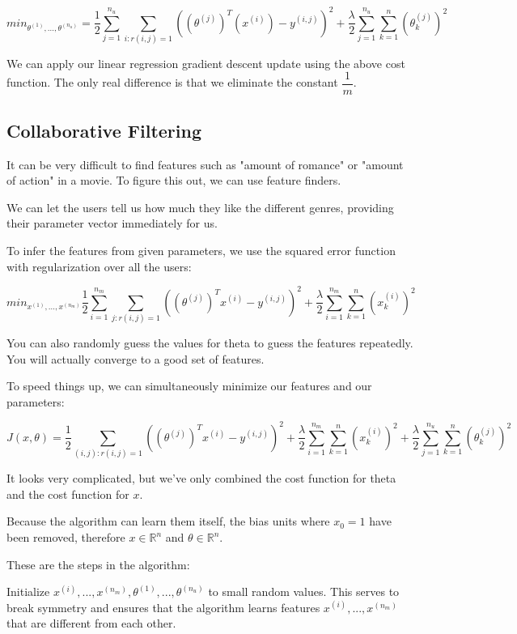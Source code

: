 \documentclass[a4paper,11pt]{report}
\begin{document}
$$min_{\theta^{(1)},\dots,\theta^{(n_u)}} = \dfrac{1}{2}\displaystyle \sum_{j=1}^{n_u} \sum_{i:r(i,j)=1} ((\theta^{(j)})^T(x^{(i)}) - y^{(i,j)})^2 + \dfrac{\lambda}{2} \sum_{j=1}^{n_u} \sum_{k=1}^n(\theta_k^{(j)})^2$$

We can apply our linear regression gradient descent update using the above cost function. The only real difference is that we eliminate the constant $\dfrac{1}{m}$.

\subsection*{Collaborative Filtering}

It can be very difficult to find features such as "amount of romance" or "amount of action" in a movie. To figure this out, we can use feature finders.

We can let the users tell us how much they like the different genres, providing their parameter vector immediately for us.

To infer the features from given parameters, we use the squared error function with regularization over all the users:

$$min_{x^{(1)},\dots,x^{(n_m)}} \dfrac{1}{2} \displaystyle \sum_{i=1}^{n_m} \sum_{j:r(i,j)=1} ((\theta^{(j)})^T x^{(i)} - y^{(i,j)})^2 + \dfrac{\lambda}{2}\sum_{i=1}^{n_m} \sum_{k=1}^{n} (x_k^{(i)})^2$$

You can also randomly guess the values for theta to guess the features repeatedly. You will actually converge to a good set of features.

To speed things up, we can simultaneously minimize our features and our parameters:

$$J(x,\theta) = \dfrac{1}{2} \displaystyle \sum_{(i,j):r(i,j)=1}((\theta^{(j)})^Tx^{(i)} - y^{(i,j)})^2 + \dfrac{\lambda}{2}\sum_{i=1}^{n_m} \sum_{k=1}^{n} (x_k^{(i)})^2 + \dfrac{\lambda}{2}\sum_{j=1}^{n_u} \sum_{k=1}^{n} (\theta_k^{(j)})^2$$

It looks very complicated, but we've only combined the cost function for theta and the cost function for $x$.

Because the algorithm can learn them itself, the bias units where $x_0=1$ have been removed, therefore $x\in\mathbb{ℝ}^n$ and $\theta \in\mathbb{ℝ}^n$.

These are the steps in the algorithm:

Initialize $x^{(i)},...,x^{(n_m)},\theta^{(1)},...,\theta^{(n_u)}$ to small random values. This serves to break symmetry and ensures that the algorithm learns features $x^{(i)},...,x^{(n_m)}$ that are different from each other.
\end{document}
